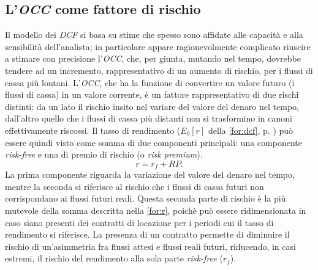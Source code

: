 \subsection{L'\textit{OCC} come fattore di rischio}
\label{subs:occ}
Il modello dei \textit{DCF} si basa su stime che spesso sono affidate alle capacità e alla sensibilità dell'analista; in particolare appare ragionevolmente complicato riuscire a stimare con precisione l'\textit{OCC}, che, per giunta, mutando nel tempo, dovrebbe tendere ad un incremento, rappresentativo di un aumento di rischio, per i flussi di cassa più lontani. L'\textit{OCC}, che ha la funzione di convertire un valore futuro (i flussi di cassa) in un valore corrente, è un fattore rappresentativo di due rischi distinti: da un lato il rischio insito nel variare del valore del denaro nel tempo, dall'altro quello che i flussi di cassa più distanti non si trasformino in canoni effettivamente riscossi.
Il tasso di rendimento ($ E_0[r] $ della \ref{for:dcf}, p. \pageref{for:dcf}) può essere quindi visto come somma di due componenti principali: una componente {\itshape risk-free} e una di premio di rischio (o {\itshape risk premium}). 
\begin{equation}
r = r_f + RP.
\label{for:r}
\end{equation}
La prima componente riguarda la variazione del valore del denaro nel tempo, mentre la seconda si riferisce al rischio che i flussi di cassa futuri non corrispondano ai flussi futuri reali.
Questa seconda parte di rischio è la più mutevole della somma descritta nella \ref{for:r}, poichè può essere ridimensionata in caso siano presenti dei contratti di locazione per i periodi cui il tasso di rendimento si riferisce. La presenza di un contratto permette di diminuire il rischio di un'asimmetria fra flussi attesi e flussi reali futuri, riducendo, in casi estremi, il rischio del rendimento alla sola parte {\itshape risk-free} ($ r_f $).

